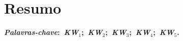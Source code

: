 \chapter*{Resumo}
\noindent \lipsum[2]

\vspace{5mm}
\noindent\textbf{\textit{Palavras-chave}:~\textit{KW$_1$};~\textit{KW$_2$};~\textit{KW$_3$};~\textit{KW$_4$};~\textit{KW$_5$}.}